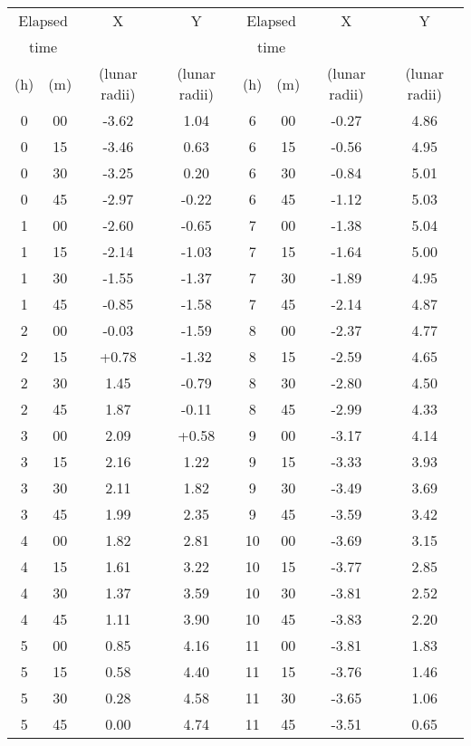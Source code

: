\begin{center} \begin{tabular}{c c c c|c c c c} \hline \multicolumn{2}{c}{Elapsed} & X & Y & \multicolumn{2}{c}{Elapsed} & X & Y \\ \multicolumn{2}{c}{time} & & & \multicolumn{2}{c}{time} & & \\ (h) & (m) & (lunar radii) & (lunar radii) & (h) & (m) & (lunar radii) & (lunar radii) \\ \hline 0 & 00 & -3.62 & 1.04 & 6 & 00 & -0.27 & 4.86 \\ 0 & 15 & -3.46 & 0.63 & 6 & 15 & -0.56 & 4.95 \\ 0 & 30 & -3.25 & 0.20 & 6 & 30 & -0.84 & 5.01 \\ 0 & 45 & -2.97 & -0.22 & 6 & 45 & -1.12 & 5.03 \\ 1 & 00 & -2.60 & -0.65 & 7 & 00 & -1.38 & 5.04 \\ 1 & 15 & -2.14 & -1.03 & 7 & 15 & -1.64 & 5.00 \\ 1 & 30 & -1.55 & -1.37 & 7 & 30 & -1.89 & 4.95 \\ 1 & 45 & -0.85 & -1.58 & 7 & 45 & -2.14 & 4.87 \\ 2 & 00 & -0.03 & -1.59 & 8 & 00 & -2.37 & 4.77 \\ 2 & 15 & +0.78 & -1.32 & 8 & 15 & -2.59 & 4.65 \\ 2 & 30 & 1.45 & -0.79 & 8 & 30 & -2.80 & 4.50 \\ 2 & 45 & 1.87 & -0.11 & 8 & 45 & -2.99 & 4.33 \\ 3 & 00 & 2.09 & +0.58 & 9 & 00 & -3.17 & 4.14 \\ 3 & 15 & 2.16 & 1.22 & 9 & 15 & -3.33 & 3.93 \\ 3 & 30 & 2.11 & 1.82 & 9 & 30 & -3.49 & 3.69 \\ 3 & 45 & 1.99 & 2.35 & 9 & 45 & -3.59 & 3.42 \\ 4 & 00 & 1.82 & 2.81 & 10 & 00 & -3.69 & 3.15 \\ 4 & 15 & 1.61 & 3.22 & 10 & 15 & -3.77 & 2.85 \\ 4 & 30 & 1.37 & 3.59 & 10 & 30 & -3.81 & 2.52 \\ 4 & 45 & 1.11 & 3.90 & 10 & 45 & -3.83 & 2.20 \\ 5 & 00 & 0.85 & 4.16 & 11 & 00 & -3.81 & 1.83 \\ 5 & 15 & 0.58 & 4.40 & 11 & 15 & -3.76 & 1.46 \\ 5 & 30 & 0.28 & 4.58 & 11 & 30 & -3.65 & 1.06 \\ 5 & 45 & 0.00 & 4.74 & 11 & 45 & -3.51 & 0.65 \\ \hline

\end{tabular} \end{center}

